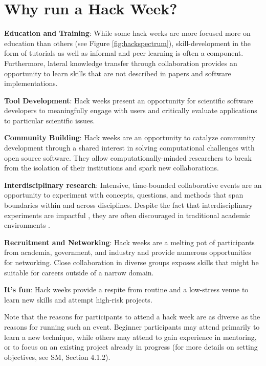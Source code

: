 \section*{Why run a Hack Week?}

\noindent\textbf{Education and Training}: While some hack weeks are more focused more on education than others (see Figure \ref{fig:hackspectrum}), skill-development in the form of tutorials as well as informal and peer learning is often a component. Furthermore, lateral knowledge transfer \cite{b:wilson-swc-lessons-2016} through collaboration provides an opportunity to learn skills that are not described in papers and software implementations.

\noindent\textbf{Tool Development}: Hack weeks present an opportunity for scientific software developers to meaningfully engage with users and critically evaluate applications to particular scientific issues.

\noindent\textbf{Community Building}: Hack weeks are an opportunity to catalyze community development through a shared interest in solving computational challenges with open source software. They allow computationally-minded researchers to break from the isolation of their institutions and spark new collaborations.

\noindent\textbf{Interdisciplinary research}: Intensive, time-bounded collaborative events are an opportunity to experiment with concepts, questions, and methods that span boundaries within and across disciplines. Despite the fact that interdisciplinary experiments are impactful \cite{Hall2012-hi}, they are often discouraged in traditional academic environments \cite{Sung2003-go}.

\noindent\textbf{Recruitment and Networking}: Hack weeks are a melting pot of participants from academia, government, and industry and provide numerous opportunities for networking. Close collaboration in diverse groups exposes skills that might be suitable for careers outside of a narrow domain.

\noindent\textbf{It's fun}: Hack weeks provide a respite from routine and a low-stress venue to learn new skills and attempt high-risk projects.

\noindent Note that the reasons for participants to attend a hack week are as diverse as the reasons for running such an event.
Beginner participants may attend primarily to learn a new technique, while others may attend to gain experience in mentoring, or to focus on an existing project already in progress (for more details on setting objectives, see SM, Section 4.1.2).
